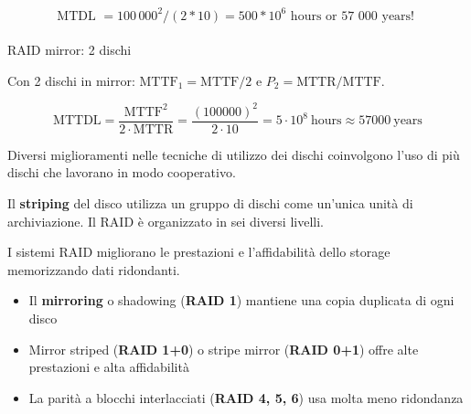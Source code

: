 \begin{equation*}
  \text{MTDL } = 100\,000^2 / (2*10) = 500 * 10^6 \text{ hours or 57 000 years! }
\end{equation*}

\paragraph{}

RAID mirror: 2 dischi

Con 2 dischi in mirror: $\mathrm{MTTF}_1 = \mathrm{MTTF}/2$ e $P_2 = \mathrm{MTTR}/\mathrm{MTTF}$.

\begin{equation*}
  \mathrm{MTTDL} = \frac{\mathrm{MTTF}^2}{2\cdot\mathrm{MTTR}} = \frac{(100000)^2}{2\cdot10} = 5\cdot10^8\ \text{hours} \approx 57000\ \text{years}
\end{equation*}

\vspace{1cm}

Diversi miglioramenti nelle tecniche di utilizzo dei dischi coinvolgono l'uso di
più dischi che lavorano in modo cooperativo.

Il \textbf{striping} del disco utilizza un gruppo di dischi come un'unica unità di archiviazione. Il RAID è organizzato in sei diversi livelli.

I sistemi RAID migliorano le prestazioni e l'affidabilità dello storage memorizzando dati ridondanti.


\begin{itemize}
  \item Il \textbf{mirroring} o shadowing (\textbf{RAID 1}) mantiene una copia duplicata di ogni disco
  \item Mirror striped (\textbf{RAID 1+0}) o stripe mirror (\textbf{RAID 0+1}) offre alte prestazioni e alta affidabilità
  \item La parità a blocchi interlacciati (\textbf{RAID 4, 5, 6}) usa molta meno ridondanza
\end{itemize}


